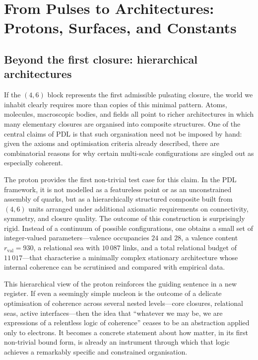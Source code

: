 \documentclass[11pt,a4paper]{article}
\theoremstyle{definition}
\begin{document}
\section{From Pulses to Architectures: Protons, Surfaces, and Constants}
\label{sec:architectures}

\subsection{Beyond the first closure: hierarchical architectures}

If the \((4,6)\) block represents the first admissible pulsating closure, the world we inhabit clearly requires more than copies of this minimal pattern. Atoms, molecules, macroscopic bodies, and fields all point to richer architectures in which many elementary closures are organised into composite structures. One of the central claims of PDL is that such organisation need not be imposed by hand: given the axioms and optimisation criteria already described, there are combinatorial reasons for why certain multi-scale configurations are singled out as especially coherent.\cite{Laubscher_EmergencePhysicalReality_2024,Laubscher_PDL_GlobalMapping_v6_2024}

The proton provides the first non-trivial test case for this claim. In the PDL framework, it is not modelled as a featureless point or as an unconstrained assembly of quarks, but as a hierarchically structured composite built from \((4,6)\) units arranged under additional axiomatic requirements on connectivity, symmetry, and closure quality.\cite{Laubscher_ProtonArch_v1_2024,Laubscher_ProtonArch_v2_2024} The outcome of this construction is surprisingly rigid. Instead of a continuum of possible configurations, one obtains a small set of integer-valued parameters---valence occupancies \(24\) and \(28\), a valence content \(r_{\mathrm{val}} = 930\), a relational sea with \(10\,087\) links, and a total relational budget of \(11\,017\)---that characterise a minimally complex stationary architecture whose internal coherence can be scrutinised and compared with empirical data.\cite{Laubscher_ProtonArch_v2_2024,Laubscher_PDL_GlobalMapping_v6_2024}

This hierarchical view of the proton reinforces the guiding sentence in a new register. If even a seemingly simple nucleon is the outcome of a delicate optimisation of coherence across several nested levels---core closures, relational seas, active interfaces---then the idea that ``whatever we may be, we are expressions of a relentless logic of coherence'' ceases to be an abstraction applied only to electrons. It becomes a concrete statement about how matter, in its first non-trivial bound form, is already an instrument through which that logic achieves a remarkably specific and constrained organisation.\cite{Laubscher_Existence_PulsatingClosure_2026}
\end{document}
